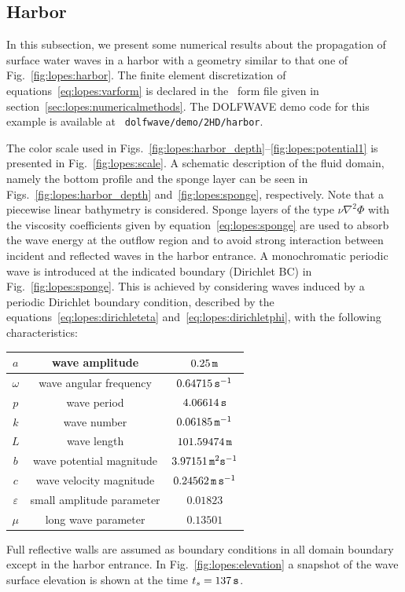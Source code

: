 \subsection{Harbor}
In this subsection, we present some numerical results about
the propagation of surface water waves in a harbor with a
geometry similar to that one of Fig.~\ref{fig:lopes:harbor}.
The finite element discretization of
equations~\eqref{eq:lopes:varform} is declared in the
\ufl\ form file given in
section~\ref{sec:lopes:numericalmethods}.  The DOLFWAVE demo
code for this example is available at {\tt
  dolfwave/demo/2HD/harbor}.

The color scale used in
Figs.~\ref{fig:lopes:harbor_depth}--\ref{fig:lopes:potential1}
is presented in Fig.~\ref{fig:lopes:scale}.  A schematic
description of the fluid domain, namely the bottom profile
and the sponge layer can be seen in
Figs.~\ref{fig:lopes:harbor_depth}
and~\ref{fig:lopes:sponge}, respectively.  Note that a
piecewise linear bathymetry is considered.  Sponge layers of
the type $\nu\nabla^2\Phi$ with the viscosity coefficients
given by equation~\eqref{eq:lopes:sponge} are used to absorb
the wave energy at the outflow region and to avoid strong
interaction between incident and reflected waves in the
harbor entrance.  A monochromatic periodic wave is
introduced at the indicated boundary (Dirichlet BC) in
Fig.~\ref{fig:lopes:sponge}.  This is achieved by
considering waves induced by a periodic Dirichlet boundary
condition, described by the
equations~\eqref{eq:lopes:dirichleteta}
and~\eqref{eq:lopes:dirichletphi}, with the following
characteristics:
\smallskip
\begin{center}
\renewcommand{\arraystretch}{1.3}
\begin{tabular}{|c|c|c|}
\hline $a$ & wave amplitude & $0.25 \,{\tt m}$\\ \hline
$\omega$ & wave angular frequency & $0.64715 \,{\tt
  s}^{-1}$\\ \hline $p$ & wave period & $4.06614 \,{\tt
  s}$\\ \hline $k$ & wave number & $0.06185 \,{\tt
  m}^{-1}$\\ \hline $L$ & wave length & $101.59474 \,{\tt
  m}$\\ \hline $b$ & wave potential magnitude& $3.97151
\,{\tt m}^2{\tt s}^{-1}$\\ \hline $c$ & wave velocity
magnitude& $0.24562 \,{\tt m\, s}^{-1}$ \\ \hline
$\varepsilon$& small amplitude parameter &
$0.01823$\\ \hline $\mu$ & long wave parameter &
$0.13501$\\ \hline
\end{tabular}
\end{center}
\smallskip
Full reflective walls are assumed as boundary conditions in
all domain boundary except in the harbor entrance.  In
Fig.~\ref{fig:lopes:elevation} a snapshot of the wave
surface elevation is shown at the time $t_s=137\,{\tt s}$.

